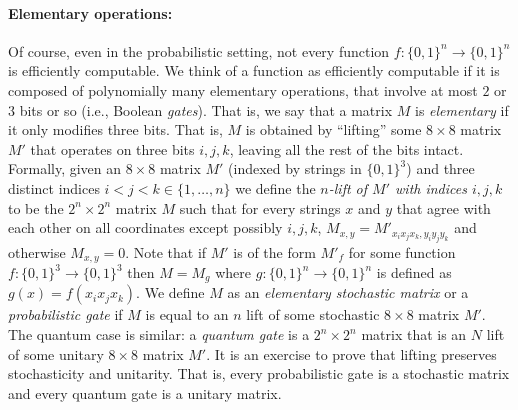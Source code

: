 \paragraph{Elementary operations:} Of course, even in the probabilistic
setting, not every function \(f:\{0,1\}^n\rightarrow\{0,1\}^n\) is
efficiently computable. We think of a function as efficiently computable
if it is composed of polynomially many elementary operations, that
involve at most \(2\) or \(3\) bits or so (i.e., Boolean \emph{gates}).
That is, we say that a matrix \(M\) is \emph{elementary} if it only
modifies three bits. That is, \(M\) is obtained by ``lifting'' some
\(8\times 8\) matrix \(M'\) that operates on three bits \(i,j,k\),
leaving all the rest of the bits intact. Formally, given an
\(8\times 8\) matrix \(M'\) (indexed by strings in \(\{0,1\}^3\)) and
three distinct indices \(i<j<k \in \{1,\ldots,n\}\) we define the
\emph{\(n\)-lift of \(M'\) with indices \(i,j,k\)} to be the
\(2^n\times 2^n\) matrix \(M\) such that for every strings \(x\) and
\(y\) that agree with each other on all coordinates except possibly
\(i,j,k\), \(M_{x,y}=M'_{x_ix_jx_k,y_iy_jy_k}\) and otherwise
\(M_{x,y}=0\). Note that if \(M'\) is of the form \(M'_f\) for some
function \(f:\{0,1\}^3\rightarrow\{0,1\}^3\) then \(M=M_g\) where
\(g:\{0,1\}^n\rightarrow\{0,1\}^n\) is defined as \(g(x)=f(x_ix_jx_k)\).
We define \(M\) as an \emph{elementary stochastic matrix} or a
\emph{probabilistic gate} if \(M\) is equal to an \(n\) lift of some
stochastic \(8\times 8\) matrix \(M'\). The quantum case is similar: a
\emph{quantum gate} is a \(2^n\times 2^n\) matrix that is an \(N\) lift
of some unitary \(8\times 8\) matrix \(M'\). It is an exercise to prove
that lifting preserves stochasticity and unitarity. That is, every
probabilistic gate is a stochastic matrix and every quantum gate is a
unitary matrix.


